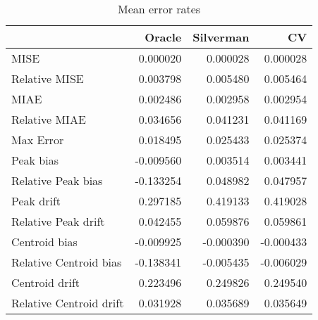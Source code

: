 \begin{table}[H]
\centering
\begin{tabular}{lrrr}
  \hline
 & Oracle & Silverman & CV \\ 
  \hline
MISE & 0.000020 & 0.000028 & 0.000028 \\ 
  Relative MISE & 0.003798 & 0.005480 & 0.005464 \\ 
  MIAE & 0.002486 & 0.002958 & 0.002954 \\ 
  Relative MIAE & 0.034656 & 0.041231 & 0.041169 \\ 
  Max Error & 0.018495 & 0.025433 & 0.025374 \\ 
  Peak bias & -0.009560 & 0.003514 & 0.003441 \\ 
  Relative Peak bias & -0.133254 & 0.048982 & 0.047957 \\ 
  Peak drift & 0.297185 & 0.419133 & 0.419028 \\ 
  Relative Peak drift & 0.042455 & 0.059876 & 0.059861 \\ 
  Centroid bias & -0.009925 & -0.000390 & -0.000433 \\ 
  Relative Centroid bias & -0.138341 & -0.005435 & -0.006029 \\ 
  Centroid drift & 0.223496 & 0.249826 & 0.249540 \\ 
  Relative Centroid drift & 0.031928 & 0.035689 & 0.035649 \\ 
   \hline
\end{tabular}
\caption{Mean error rates} 
\label{tbl:mean_error_rates}
\end{table}
